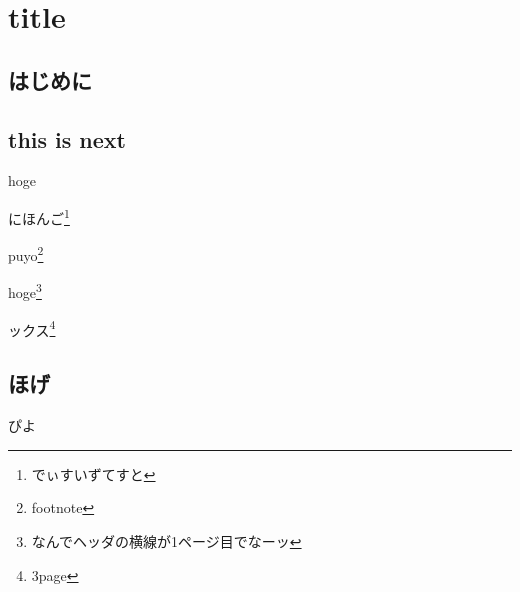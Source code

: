 \documentclass{word-lua}
\author{著者}
\subtitle{fuck}
\begin{document}
\chapter{title}

\section{はじめに}
\section{this is next}

hoge

にほんご\footnote{でぃすいずてすと}

puyo\footnote{footnote}

hoge\footnote{なんでヘッダの横線が1ページ目でなーッ}

ックス\footnote{3page}

\newpage

\section{ほげ}

\newpage

ぴよ

\end{document}
